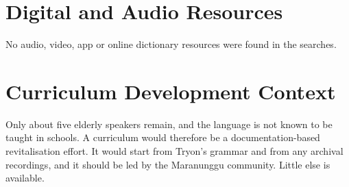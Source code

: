 \documentclass[12pt]{article}
\begin{document}
\section{Digital and Audio Resources}
No audio, video, app or online dictionary resources were found in the searches.

\section{Curriculum Development Context}
Only about five elderly speakers remain, and the language is not known to be taught in schools. A curriculum would therefore be a documentation-based revitalisation effort. It would start from Tryon's grammar and from any archival recordings, and it should be led by the Maranunggu community. Little else is available.
\end{document}

